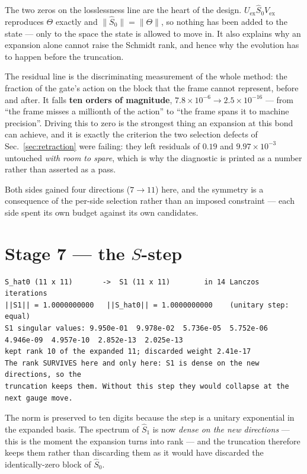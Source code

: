 \documentclass[11pt,a4paper]{article}
\newcommand{\Theb}{\Theta}
\newcommand{\Uex}{U_{\mathrm{ex}}}
\newcommand{\Vex}{V_{\mathrm{ex}}}
\begin{document}
\noindent
The two zeros on the losslessness line are the heart of the design. $\Uex \hat S_0 \Vex$
reproduces $\Theb$ exactly and $\|\hat S_0\| = \|\Theb\|$, so nothing has been added to the
state --- only to the space the state is allowed to move in. It also explains why an expansion
alone cannot raise the Schmidt rank, and hence why the evolution has to happen before the
truncation.

The residual line is the discriminating measurement of the whole method: the fraction of the
gate's action on the block that the frame cannot represent, before and after. It falls
\textbf{ten orders of magnitude}, $7.8\times10^{-6} \to 2.5\times10^{-16}$ --- from ``the frame
misses a millionth of the action'' to ``the frame spans it to machine precision''. Driving this
to zero is the strongest thing an expansion at this bond can achieve, and it is exactly the
criterion the two selection defects of Sec.~\ref{sec:retraction} were failing: they left
residuals of $0.19$ and $9.97\times10^{-3}$ untouched \emph{with room to spare}, which is why the
diagnostic is printed as a number rather than asserted as a pass.

Both sides gained four directions ($7 \to 11$) here, and the symmetry is a consequence of the
per-side selection rather than an imposed constraint --- each side spent its own budget against
its own candidates.

\section{Stage 7 --- the $S$-step}

\begin{lstlisting}
S_hat0 (11 x 11)       ->  S1 (11 x 11)        in 14 Lanczos iterations
||S1|| = 1.0000000000   ||S_hat0|| = 1.0000000000    (unitary step: equal)
S1 singular values: 9.950e-01  9.978e-02  5.736e-05  5.752e-06  4.946e-09  4.957e-10  2.852e-13  2.025e-13
kept rank 10 of the expanded 11; discarded weight 2.41e-17
The rank SURVIVES here and only here: S1 is dense on the new directions, so the
truncation keeps them. Without this step they would collapse at the next gauge move.
\end{lstlisting}

\noindent
The norm is preserved to ten digits because the step is a unitary exponential in the expanded
basis. The spectrum of $\hat S_1$ is now \emph{dense on the new directions} --- this is the
moment the expansion turns into rank --- and the truncation therefore keeps them rather than
discarding them as it would have discarded the identically-zero block of $\hat S_0$.
\end{document}

